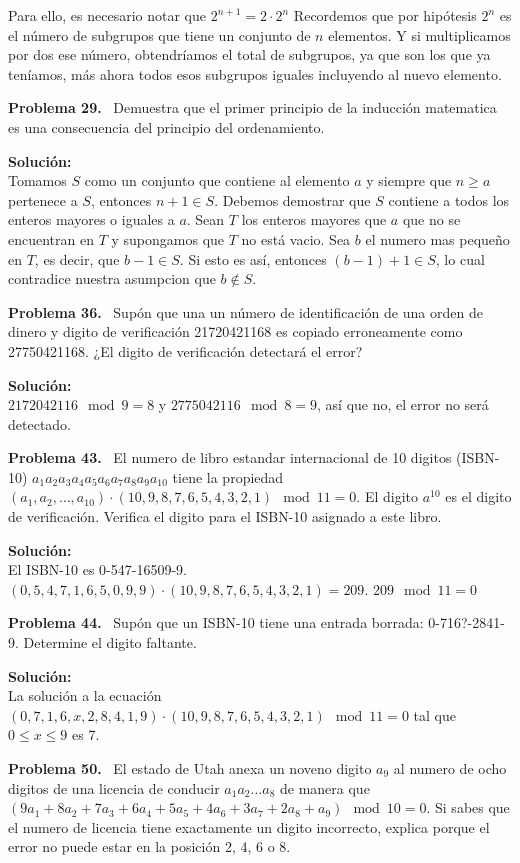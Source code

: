 \documentclass{article}
\newcounter{problem}
\newcounter{solution}
\newcommand\Problem[1]{%
  \stepcounter{problem}%
  \textbf{Problema #1.}~%
  \setcounter{solution}{0}%
}
\newcommand\TheSolution{%
  \textbf{Solución:}\\%
}
\begin{document}
Para ello, es necesario notar que $2^{n+1} = 2\cdot 2^{n}$ Recordemos que por
hipótesis $2^{n}$ es el n\'umero de subgrupos que tiene un conjunto de $n$
elementos. Y si multiplicamos por dos ese número, obtendríamos el total de
subgrupos, ya que son los que ya teníamos, más ahora todos esos subgrupos
iguales incluyendo al nuevo elemento.

\Problem{29} Demuestra que el primer principio de la inducción matematica es
una consecuencia del principio del ordenamiento.

\TheSolution{}
Tomamos $S$ como un conjunto que contiene al elemento $a$ y siempre que $n
\geq a$ pertenece a $S$, entonces $n + 1 \in S$. Debemos demostrar que $S$
contiene a todos los enteros mayores o iguales a $a$. Sean $T$ los enteros
mayores que $a$ que no se encuentran en $T$ y supongamos que $T$ no está vacio.
Sea $b$ el numero mas pequeño en $T$, es decir, que $b - 1 \in S$. Si esto es
así, entonces $(b - 1) + 1 \in S$, lo cual contradice nuestra asumpcion que $b
\nin S$.

\Problem{36} Supón que una un número de identificación de una orden de dinero y
digito de verificación 21720421168 es copiado erroneamente como 27750421168.
¿El digito de verificación detectará el error?

\TheSolution{}
$2172042116 \mod 9 = 8$ y $2775042116 \mod 8 = 9$, así que no, el error no será
detectado.

\Problem{43} El numero de libro estandar internacional de 10 digitos (ISBN-10)
$a_1 a_2 a_3 a_4 a_5 a_6 a_7 a_8 a_9 a_{10}$ tiene la propiedad
$(a_1,a_2,\ldots,a_{10})\cdot(10,9,8,7,6,5,4,3,2,1) \mod 11 = 0$. El digito
$a^{10}$ es el digito de verificación. Verifica el digito para el ISBN-10
asignado a este libro.

\TheSolution{}
El ISBN-10 es 0-547-16509-9. $(0,5,4,7,1,6,5,0,9,9)\cdot(10,9,8,7,6,5,4,3,2,1)
= 209$. $209 \mod 11 = 0$

\Problem{44} Supón que un ISBN-10 tiene una entrada borrada: 0-716?-2841-9.
Determine el digito faltante.

\TheSolution{} La solución a la ecuación $(0,7,1,6,x,2,8,4,1,9) \cdot (10,9,
8,7,6,5,4,3,2,1) \mod 11 = 0$ tal que $0 \leq x \leq 9$ es 7.

\Problem{50} El estado de Utah anexa un noveno digito $a_9$ al numero de ocho
digitos de una licencia de conducir $a_1 a_2 \ldots a_8$ de manera que $(9a_1 +
8a_2 + 7a_3 + 6a_4 + 5a_5 + 4a_6 + 3a_7 + 2a_8 + a_9) \mod 10 = 0$. Si sabes
que el numero de licencia tiene exactamente un digito incorrecto, explica
porque el error no puede estar en la posición 2, 4, 6 o 8.
\end{document}
